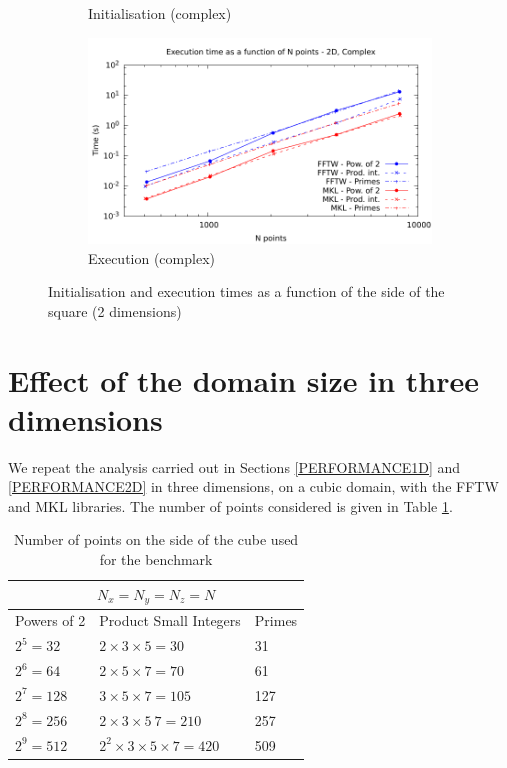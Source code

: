 \documentclass[12pt, a4paper]{article} \setlength{\textheight}{24cm}
\begin{document}
\begin{figure}[H]
\begin{subfigure}{.5\textwidth}
    \caption{Initialisation (complex)}
    \label{2DCI}
  \end{subfigure}%
  \begin{subfigure}{.5\textwidth}
    \centering
    \includegraphics[width=.9\linewidth]{graphs/2d-exec-c.pdf}
    \caption{Execution (complex)}
    \label{2DC}
  \end{subfigure}
  \caption{Initialisation and execution times as a function of the
    side of the square (2 dimensions)}
  \label{2D}
\end{figure}

\section{Effect of the domain size in three  dimensions}\label{PERFORMANCE3D}

We repeat the analysis carried out in Sections \ref{PERFORMANCE1D} and
\ref{PERFORMANCE2D} in three dimensions, on a cubic domain, with the
FFTW and MKL libraries. The number of points considered is given in
Table \ref{SIZES3D}.

\begin{table}[H]
  \captionsetup{width=0.85\linewidth}
  \centering
  \begin{tabular}{|l|l|l|}
    \hline
    \multicolumn{3}{|c|}{$N_x=N_y=N_z=N$}\\
    \hline
    \hline
    Powers of 2 & Product Small Integers & Primes\\ \hline
    $2^5=32$ & $2\times 3\times 5=30$	& 31\\ \hline
    $2^6=64$ & $2\times 5\times 7=70$	& 61\\ \hline
    $2^7=128$ & $3\times 5\times 7=105$ & 127\\ \hline
    $2^8=256$ & $2\times 3\times 5\ 7=210$ & 257\\ \hline
    $2^9=512$ & $2^2\times 3\times 5\times 7=420$ & 509\\ \hline
  \end{tabular}
  \caption{Number of points on the side of the cube used for the benchmark}\label{SIZES3D}
\end{table}
\end{document}
